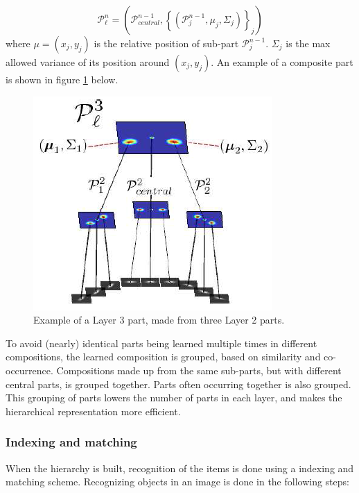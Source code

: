 \begin{equation}
\mathcal{P}_{\ell}^n = \left(\mathcal{P}_{central}^{n-1} , \left\{\left(\mathcal{P}_j^{n-1}, \mu_j, \Sigma_j \right) \right\}_j \right)
\label{eqn:composition_of_parts}
\end{equation}
where $\mu = (x_j, y_j)$ is the relative position of sub-part $\mathcal{P}_{j}^{n-1}$. 
$\Sigma_j$ is the max allowed variance of its position around $(x_j, y_j)$. An example of a composite part is shown in figure \ref{fig:compositionality2} below.

\begin{figure}[h!] %
\centering
\includegraphics[scale=0.7]{graphics/compositionality2}
\caption{Example of a Layer 3 part, made from three Layer 2 parts. 
\cite[fig.~2]{fidler2009learning} }
\label{fig:compositionality2}
\end{figure}

To avoid (nearly) identical parts being learned multiple times in different compositions, the learned composition is grouped, based on similarity and co-occurrence. 
Compositions made up from the same sub-parts, but with different central parts, is grouped together. Parts often occurring together is also grouped. This grouping of parts lowers the number of parts in each layer, and makes the hierarchical representation more efficient. 

\subsubsection{Indexing and matching}
\label{sec:indexing-matching}
When the hierarchy is built, recognition of the items is done using a indexing and matching scheme. Recognizing objects in an image is done in the following steps: 


